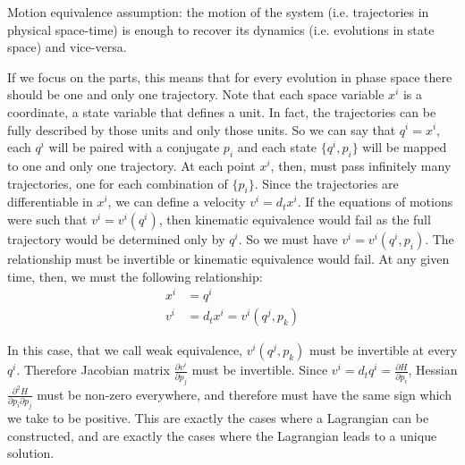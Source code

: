 \documentclass[letterpaper]{article}
\begin{document}
Motion equivalence assumption: the motion of the system (i.e. trajectories in physical space-time) is enough to recover its dynamics (i.e. evolutions in state space) and vice-versa.

If we focus on the parts, this means that for every evolution in phase space there should be one and only one trajectory. Note that each space variable $x^i$ is a coordinate, a state variable that defines a unit. In fact, the trajectories can be fully described by those units and only those units. So we can say that $q^i=x^i$, each $q^i$ will be paired with a conjugate $p_i$ and each state $\{q^i, p_i\}$ will be mapped to one and only one trajectory. At each point $x^i$, then, must pass infinitely many trajectories, one for each combination of $\{p_i\}$. Since the trajectories are differentiable in $x^i$, we can define a velocity $v^i = d_t x^i$. If the equations of motions were such that $v^i=v^i(q^i)$, then kinematic equivalence would fail as the full trajectory would be determined only by $q^i$. So we must have $v^i=v^i(q^i, p_i)$. The relationship must be invertible or kinematic equivalence would fail. At any given time, then, we must the following relationship:
\begin{equation}
\begin{aligned}
x^i &= q^i \\
v^i &= d_t x^i = v^i(q^j, p_k)
\end{aligned}
\end{equation}

In this case, that we call weak equivalence, $v^i(q^j, p_k)$ must be invertible at every $q^i$. Therefore Jacobian matrix  $\frac{\partial v^i}{\partial p_j}$ must be invertible. Since $v^i = d_t q^i = \frac{\partial H}{\partial p_i}$, Hessian $\frac{\partial^2 H}{\partial p_i \partial p_j}$ must be non-zero everywhere, and therefore must have the same sign which we take to be positive. This are exactly the cases where a Lagrangian can be constructed, and are exactly the cases where the Lagrangian leads to a unique solution.
\end{document}
